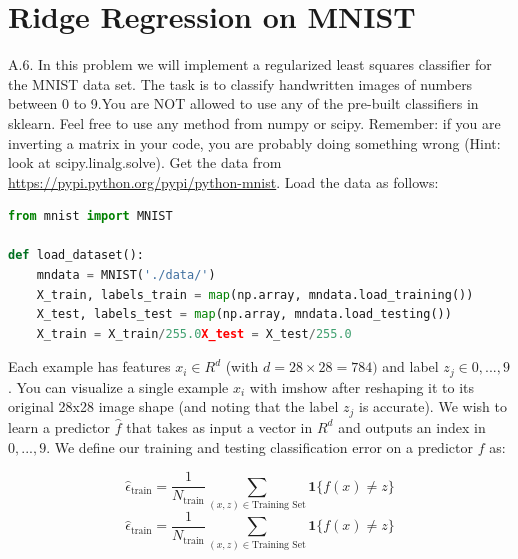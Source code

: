 \documentclass{article}
\newcommand{\1}{\mathbf{1}}
\begin{document}
\section*{Ridge Regression on MNIST}
A.6. In this problem we will implement a regularized least squares classifier for the MNIST data set. The task is to classify handwritten images of numbers between 0 to 9.You are NOT allowed to use any of the pre-built classifiers in sklearn. Feel free to use any method from numpy or scipy. Remember: if you are inverting a matrix in your code, you are probably doing something wrong (Hint: look at scipy.linalg.solve). Get the data from \url{https://pypi.python.org/pypi/python-mnist}. Load the data as follows:
\begin{lstlisting}[language=Python]
from mnist import MNIST

def load_dataset():
    mndata = MNIST('./data/')
    X_train, labels_train = map(np.array, mndata.load_training())
    X_test, labels_test = map(np.array, mndata.load_testing())
    X_train = X_train/255.0X_test = X_test/255.0
\end{lstlisting}
Each example has features $x_i\in R^d$ (with $d=28\times28=784)$ and label $z_j\in{0,...,9}$. You can visualize a single example $x_i$ with imshow after reshaping it to its original 28x28 image shape (and noting that the label $z_j$ is accurate). We wish to learn a predictor $\hat f$ that takes as input a vector in $R^d$ and outputs an index in ${0,...,9}$. We define our training and testing classification error on a predictor $f$ as:

$$\widehat\epsilon_\text{train} = \frac{1}{N_\text{train}} \sum_{(x,z)\in\text{Training Set}} \1\{f(x)\ne z\}$$
$$\widehat\epsilon_\text{train} = \frac{1}{N_\text{train}} \sum_{(x,z)\in\text{Training Set}} \1\{f(x)\ne z\}$$
\end{document}

